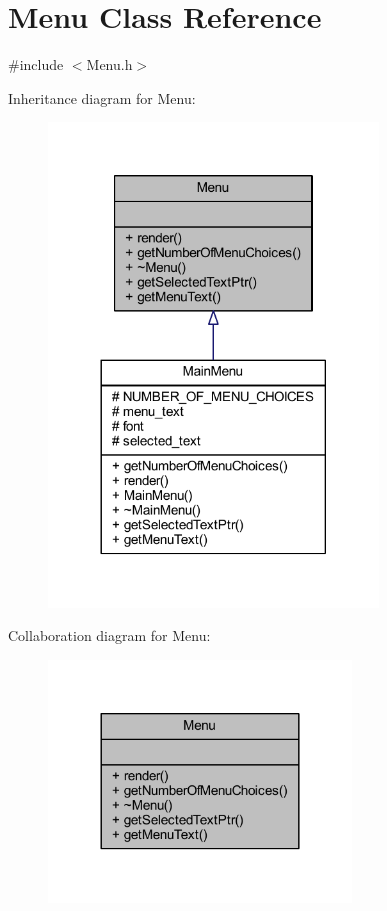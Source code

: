 \hypertarget{class_menu}{}\section{Menu Class Reference}
\label{class_menu}


{\ttfamily \#include $<$Menu.\+h$>$}



Inheritance diagram for Menu\+:
\nopagebreak
\begin{figure}[H]
\begin{center}
\leavevmode
\includegraphics[width=248pt]{class_menu__inherit__graph}
\end{center}
\end{figure}


Collaboration diagram for Menu\+:
\nopagebreak
\begin{figure}[H]
\begin{center}
\leavevmode
\includegraphics[width=228pt]{class_menu__coll__graph}
\end{center}
\end{figure}
